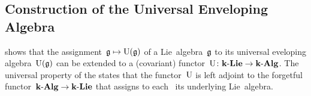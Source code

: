 \subsection{Construction of the Universal Enveloping Algebra}


\begin{remark}
   shows that the assignment~$\mathfrak{g} \mapsto \operatorname{U}(\mathfrak{g})$ of a Lie~algebra~$\mathfrak{g}$ to its universal eveloping algebra~$\operatorname{U}(\mathfrak{g})$ can be extended to a (covariant) functor~$\operatorname{U} \colon \mathbf{k}\text{-}\mathbf{Lie} \to \mathbf{k}\text{-}\mathbf{Alg}$.
  The universal property of the {\ua} states that the functor~$\operatorname{U}$ is left adjoint to the forgetful functor~$\mathbf{k}\text{-}\mathbf{Alg} \to \mathbf{k}\text{-}\mathbf{Lie}$ that assigns to each~{\algebra{$\kf$}} its underlying Lie~algebra.
\end{remark}


